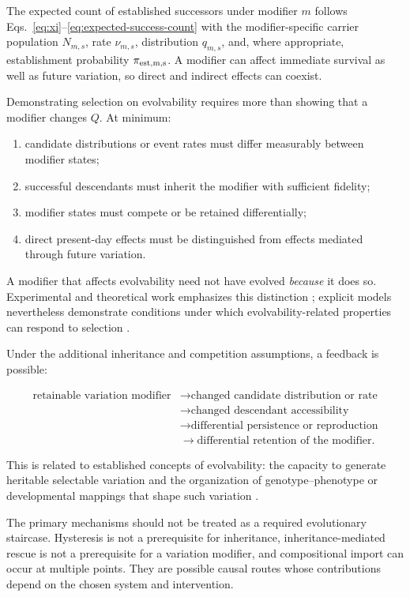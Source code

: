 \documentclass[11pt,a4paper]{article}
\begin{document}
The expected count of established successors under modifier $m$ follows Eqs.~\eqref{eq:xi}--\eqref{eq:expected-success-count} with the modifier-specific carrier population $N_{m,s}$, rate $\nu_{m,s}$, distribution $q_{m,s}$, and, where appropriate, establishment probability $\pi_{\rm est,m,s}$. A modifier can affect immediate survival as well as future variation, so direct and indirect effects can coexist.

Demonstrating selection on evolvability requires more than showing that a modifier changes $Q$. At minimum:

\begin{enumerate}
\item candidate distributions or event rates must differ measurably between modifier states;
\item successful descendants must inherit the modifier with sufficient fidelity;
\item modifier states must compete or be retained differentially;
\item direct present-day effects must be distinguished from effects mediated through future variation.
\end{enumerate}

A modifier that affects evolvability need not have evolved \emph{because} it does so. Experimental and theoretical work emphasizes this distinction \citep{DiazArenas2013,Wagner2022,Pelabon2025}; explicit models nevertheless demonstrate conditions under which evolvability-related properties can respond to selection \citep{EarlDeem2004}.

Under the additional inheritance and competition assumptions, a feedback is possible:

\[
\begin{aligned}
\text{retainable variation modifier}
&\to \text{changed candidate distribution or rate}\\
&\to \text{changed descendant accessibility}\\
&\to \text{differential persistence or reproduction}\\
&\to \text{differential retention of the modifier}.
\end{aligned}
\]

This is related to established concepts of evolvability: the capacity to generate heritable selectable variation and the organization of genotype--phenotype or developmental mappings that shape such variation \citep{WagnerAltenberg1996,Gerhart2007}.

The primary mechanisms should not be treated as a required evolutionary staircase. Hysteresis is not a prerequisite for inheritance, inheritance-mediated rescue is not a prerequisite for a variation modifier, and compositional import can occur at multiple points. They are possible causal routes whose contributions depend on the chosen system and intervention.
\end{document}

